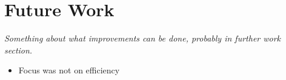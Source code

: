 
\chapter{Future Work}

\textit{Something about what improvements can be done, probably in further work section.}

\begin{itemize}
    \item Focus was not on efficiency
\end{itemize}

\cleardoublepage